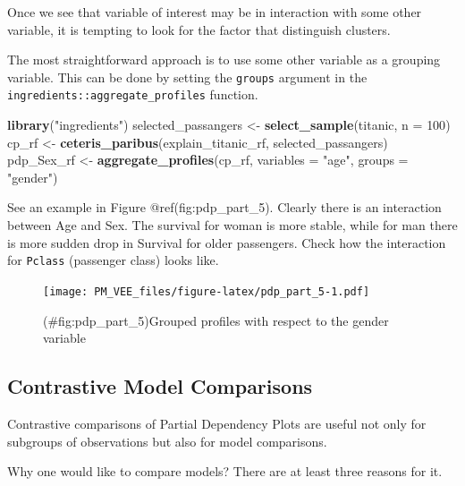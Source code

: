 \documentclass[12pt,]{krantz}
\newenvironment{Shaded}{\begin{snugshade}}{\end{snugshade}}
\newcommand{\DataTypeTok}[1]{\textcolor[rgb]{0.13,0.29,0.53}{#1}}
\newcommand{\DecValTok}[1]{\textcolor[rgb]{0.00,0.00,0.81}{#1}}
\newcommand{\KeywordTok}[1]{\textcolor[rgb]{0.13,0.29,0.53}{\textbf{#1}}}
\newcommand{\NormalTok}[1]{#1}
\newcommand{\StringTok}[1]{\textcolor[rgb]{0.31,0.60,0.02}{#1}}
\begin{document}
Once we see that variable of interest may be in interaction with some other variable, it is tempting to look for the factor that distinguish clusters.

The most straightforward approach is to use some other variable as a grouping variable. This can be done by setting the \texttt{groups} argument in the \texttt{ingredients::aggregate\_profiles} function.

\begin{Shaded}
\begin{Highlighting}[]
\KeywordTok{library}\NormalTok{(}\StringTok{"ingredients"}\NormalTok{)}
\NormalTok{selected_passangers <-}\StringTok{ }\KeywordTok{select_sample}\NormalTok{(titanic, }\DataTypeTok{n =} \DecValTok{100}\NormalTok{)}
\NormalTok{cp_rf <-}\StringTok{ }\KeywordTok{ceteris_paribus}\NormalTok{(explain_titanic_rf, selected_passangers)}
\NormalTok{pdp_Sex_rf <-}\StringTok{ }\KeywordTok{aggregate_profiles}\NormalTok{(cp_rf, }\DataTypeTok{variables =} \StringTok{"age"}\NormalTok{,}
                \DataTypeTok{groups =} \StringTok{"gender"}\NormalTok{)}
\end{Highlighting}
\end{Shaded}

See an example in Figure @ref(fig:pdp\_part\_5). Clearly there is an interaction between Age and Sex. The survival for woman is more stable, while for man there is more sudden drop in Survival for older passengers.
Check how the interaction for \texttt{Pclass} (passenger class) looks like.

\begin{figure}
\centering
\texttt{[image: PM\_VEE\_files/figure-latex/pdp\_part\_5-1.pdf]}
\caption{(\#fig:pdp\_part\_5)Grouped profiles with respect to the gender variable}
\end{figure}

\hypertarget{contrastive-model-comparisons}{%
\subsection{Contrastive Model Comparisons}\label{contrastive-model-comparisons}}

Contrastive comparisons of Partial Dependency Plots are useful not only for subgroups of observations but also for model comparisons.

Why one would like to compare models? There are at least three reasons for it.
\end{document}
